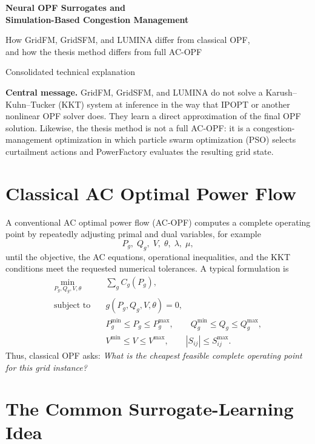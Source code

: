\documentclass[11pt,a4paper]{article}
\begin{document}
\begin{center}
  {\LARGE\bfseries\color{navy}Neural OPF Surrogates and\\[2pt]Simulation-Based Congestion Management}\par
  \vspace{0.55em}
  {\large How GridFM, GridSFM, and LUMINA differ from classical OPF,\\and how the thesis method differs from full AC-OPF}\par
  \vspace{0.7em}
  {\color{darkgray}\small Consolidated technical explanation}
\end{center}

\vspace{0.8em}
\begin{keybox}
\textbf{Central message.} GridFM, GridSFM, and LUMINA do not solve a Karush--Kuhn--Tucker (KKT) system at inference in the way that IPOPT or another nonlinear OPF solver does. They learn a direct approximation of the final OPF solution. Likewise, the thesis method is not a full AC-OPF: it is a congestion-management optimization in which particle swarm optimization (PSO) selects curtailment actions and PowerFactory evaluates the resulting grid state.
\end{keybox}

\section{Classical AC Optimal Power Flow}

A conventional AC optimal power flow (AC-OPF) computes a complete operating point by repeatedly adjusting primal and dual variables, for example
\[
P_g,\;Q_g,\;V,\;\theta,\;\lambda,\;\mu,
\]
until the objective, the AC equations, operational inequalities, and the KKT conditions meet the requested numerical tolerances. A typical formulation is
\begin{align}
\min_{P_g,Q_g,V,\theta}\quad & \sum_g C_g(P_g),\\
\text{subject to}\quad & g(P_g,Q_g,V,\theta)=0,\\
& P_g^{\min}\le P_g\le P_g^{\max},\qquad
Q_g^{\min}\le Q_g\le Q_g^{\max},\\
& V^{\min}\le V\le V^{\max},\qquad
|S_{ij}|\le S_{ij}^{\max}.
\end{align}
Thus, classical OPF asks: \emph{What is the cheapest feasible complete operating point for this grid instance?}

\section{The Common Surrogate-Learning Idea}
\end{document}
